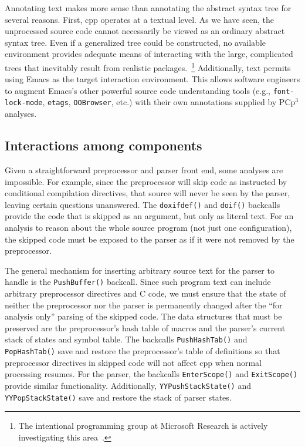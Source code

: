 \documentclass{article}
\newcommand{\pcp}{\mbox{\textsf{PCp}$^3$}}
\newcommand{\Cpp}{\mbox{\textsf{cpp}}}
\newcommand{\C}{\mbox{\textsf{C}}}
\newcommand{\eg}{e.g.,}
\newcommand{\etc}{etc}  %
\begin{document}
Annotating text makes more sense than annotating the abstract syntax
tree for several reasons.  First, \Cpp{} operates at a textual level.
As we have seen, the unprocessed source code cannot necessarily be
viewed as an ordinary abstract syntax tree.  Even if a generalized tree
could be constructed, no available environment provides adequate means
of interacting with the large, complicated trees that inevitably result
from realistic packages.~\footnote{The intentional programming group at
  Microsoft Research is actively investigating this
  area~\cite{MSIPPersonal}.}  Additionally, text permits using Emacs as the
target interaction environment. This allows software engineers to
augment Emacs's other powerful source code understanding tools (\eg{}
\texttt{font-lock-mode}, \texttt{etags}, \texttt{OOBrowser}, \etc{}.)
with their own annotations supplied by \pcp{} analyses.


\subsection{Interactions among components}

Given a straightforward preprocessor and parser front end, some analyses
are impossible.  For example, since the preprocessor will skip code as
instructed by conditional compilation directives, that source will never
be seen by the parser, leaving certain questions unanswered.  The
\texttt{doxifdef()} and \texttt{doif()} backcalls provide the code that is
skipped as an argument, but only as literal text.  For an analysis to
reason about the whole source program (not just one configuration), the
skipped code must be exposed to the parser as if it were not removed by
the preprocessor.

The general mechanism for inserting arbitrary source text for the parser
to handle is the \texttt{PushBuffer()} backcall.  Since such program text
can include arbitrary preprocessor directives and \C{} code, we must
ensure that the state of neither the preprocessor nor the parser is
permanently changed after the ``for analysis only'' parsing of the
skipped code.  The data structures that must be preserved are the
preprocessor's hash table of macros and the parser's current stack of
states and symbol table.  The backcalls \texttt{PushHashTab()} and
\texttt{PopHashTab()} save and restore the preprocessor's table of
definitions so that preprocessor directives in skipped code will not
affect \Cpp{} when normal processing resumes.  For the parser, the
backcalls \texttt{EnterScope()} and \texttt{ExitScope()} provide similar
functionality.  Additionally, \texttt{YYPushStackState()} and
\texttt{YYPopStackState()} save and restore the stack of parser states.
\end{document}
